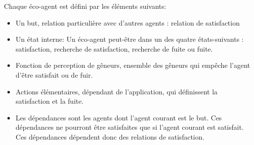             Chaque éco-agent est défini par les éléments suivants:
            \begin{itemize}
                \item Un but, relation particulière avec d'autres agents : relation de satisfaction 
                \item Un état interne:  Un éco-agent peut-être dans un des quatre états-suivants : satisfaction, recherche de satisfaction, recherche de fuite ou fuite. 
                \item Fonction de perception de gêneurs, ensemble des gêneurs qui empêche l'agent d'être satisfait ou de fuir. 
                \item Actions élémentaires, dépendant de l'application, qui définissent la satisfaction et la fuite. 
                \item Les dépendances sont les agents dont l'agent courant est le but. Ces dépendances ne pourront être satisfaites que si l'agent courant est satisfait. Ces dépendances dépendent donc des relations de satisfaction.
            \end{itemize}

